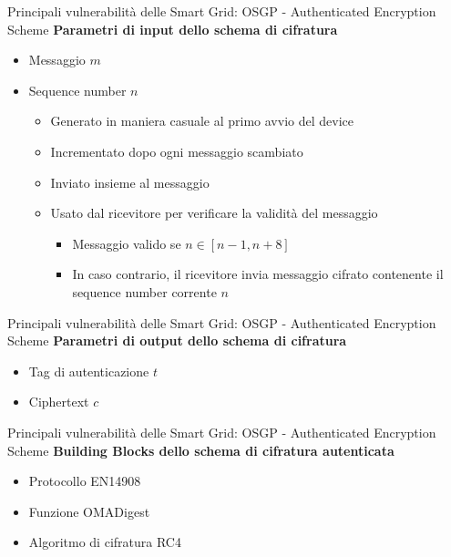 \begin{frame}{Principali vulnerabilità delle Smart Grid: OSGP - Authenticated Encryption Scheme}
	\textbf{Parametri di input dello schema di cifratura}
	\begin{itemize}[<+- | alert@+>]
		\item Messaggio $m$
		\item Sequence number $n$
		\begin{itemize}
			\item Generato in maniera casuale al primo avvio del device
			\item Incrementato dopo ogni messaggio scambiato
			\item Inviato insieme al messaggio
			\item Usato dal ricevitore per verificare la validità del messaggio
			\begin{itemize}
				\item Messaggio valido se $n \in [n-1, n+8]$
				\item In caso contrario, il ricevitore invia messaggio cifrato contenente il sequence number corrente $n$
			\end{itemize}
		\end{itemize}
	\end{itemize}
\end{frame}

\begin{frame}{Principali vulnerabilità delle Smart Grid: OSGP - Authenticated Encryption Scheme}
	\textbf{Parametri di output dello schema di cifratura}
	\begin{itemize}
		\item Tag di autenticazione $t$%
		\item Ciphertext $c$%
	\end{itemize}
\end{frame}

\begin{frame}{Principali vulnerabilità delle Smart Grid: OSGP - Authenticated Encryption Scheme}
	\textbf{Building Blocks dello schema di cifratura autenticata}
	\begin{itemize}
		\item Protocollo EN14908
		\item Funzione OMADigest
		\item Algoritmo di cifratura RC4
	\end{itemize}
\end{frame}

